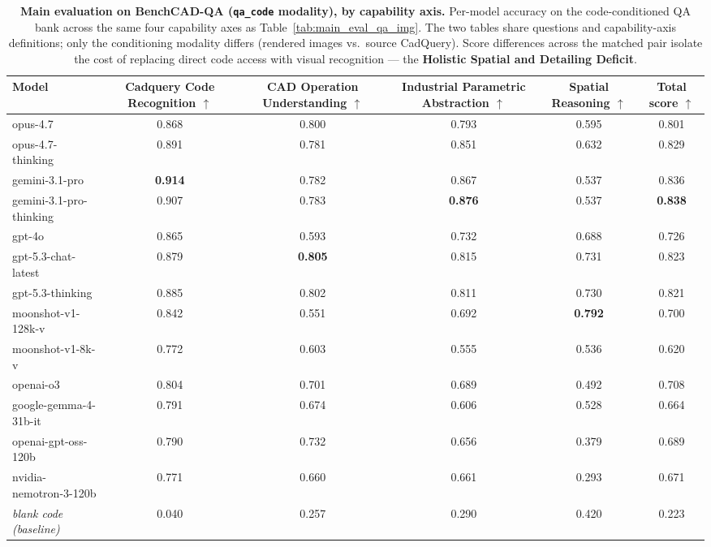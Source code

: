 \begin{table}[t]
\centering
\small
\setlength{\tabcolsep}{5pt}
\renewcommand{\arraystretch}{1.15}
\caption{\textbf{Main evaluation on BenchCAD-QA (\texttt{qa\_code} modality), by capability axis.} Per-model accuracy on the code-conditioned QA bank across the same four capability axes as Table~\ref{tab:main_eval_qa_img}. The two tables share questions and capability-axis definitions; only the conditioning modality differs (rendered images vs.\ source CadQuery). Score differences across the matched pair isolate the cost of replacing direct code access with visual recognition --- the \textbf{Holistic Spatial and Detailing Deficit}.}
\label{tab:main_eval_qa_code}
\begin{tabular}{l c c c c c}
\toprule
Model
 & \shortstack{Cadquery Code\\Recognition $\uparrow$ }
 & \shortstack{CAD Operation\\Understanding $\uparrow$ }
 & \shortstack{Industrial Parametric\\Abstraction $\uparrow$ }
 & \shortstack{Spatial\\Reasoning $\uparrow$ }
 & \shortstack{Total\\score $\uparrow$ } \\
\midrule
opus-4.7         & 0.868 & 0.800 & 0.793 & 0.595 & 0.801 \\
opus-4.7-thinking            & 0.891 & 0.781 & 0.851 & 0.632 & 0.829 \\
gemini-3.1-pro  & \textbf{0.914} & 0.782 & 0.867 & 0.537 & 0.836 \\
gemini-3.1-pro-thinking     & 0.907 & 0.783 & \textbf{0.876} & 0.537 & \textbf{0.838} \\
gpt-4o                              & 0.865 & 0.593 & 0.732 & 0.688 & 0.726 \\
gpt-5.3-chat-latest                 & 0.879 & \textbf{0.805} & 0.815 & 0.731 & 0.823 \\
gpt-5.3-thinking                    & 0.885 & 0.802 & 0.811 & 0.730 & 0.821 \\
moonshot-v1-128k-v     & 0.842    & 0.551    & 0.692    & \textbf{0.792}    & 0.700 \\                                                                       
  moonshot-v1-8k-v       & 0.772    & 0.603    & 0.555    & 0.536    & 0.620 \\               
openai-o3                & 0.804    & 0.701    & 0.689    & 0.492    & 0.708 \\                                                                
  google-gemma-4-31b-it    & 0.791    & 0.674    & 0.606    & 0.528    & 0.664 \\                                                                
  openai-gpt-oss-120b      & 0.790    & 0.732    & 0.656    & 0.379    & 0.689 \\
  nvidia-nemotron-3-120b   & 0.771    & 0.660    & 0.661    & 0.293    & 0.671 \\       
\midrule
\textit{blank code (baseline)}     & 0.040    & 0.257    & 0.290    & 0.420    & 0.223    \\
\bottomrule
\end{tabular}
\end{table}

